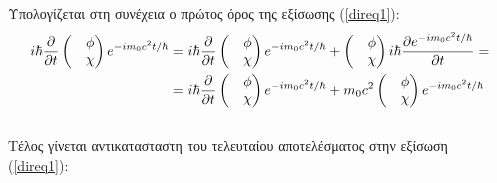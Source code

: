 Υπολογίζεται στη συνέχεια ο πρώτος όρος της εξίσωσης (\ref{direq1}):\\
\begin{equation*}
  \begin{split}
    i\hbar \frac{\partial }{\partial t} 
    \begin{pmatrix}
      &\phi\\
      &\chi
    \end{pmatrix} 
    e^{-i m_0 c^2 t / \hbar} &=
    i\hbar \frac{\partial }{\partial t} 
    \begin{pmatrix}
      &\phi\\
      &\chi
    \end{pmatrix} 
    e^{-i m_0 c^2 t / \hbar}+   
    \begin{pmatrix}
      &\phi\\
      &\chi
    \end{pmatrix} 
    i\hbar \frac{\partial  e^{-i m_0 c^2 t / \hbar}}{\partial t}= \\ 
    &=i\hbar \frac{\partial }{\partial t} 
    \begin{pmatrix}
      &\phi\\
      &\chi
    \end{pmatrix}
    e^{-i m_0 c^2 t / \hbar}+   
    m_0c^2
    \begin{pmatrix}
      &\phi\\
      &\chi
    \end{pmatrix} 
    e^{-i m_0 c^2 t / \hbar}
  \end{split}
\end{equation*}   \\
Τέλος γίνεται αντικατασταστη του τελευταίου  αποτελέσματος στην εξίσωση (\ref{direq1}):
